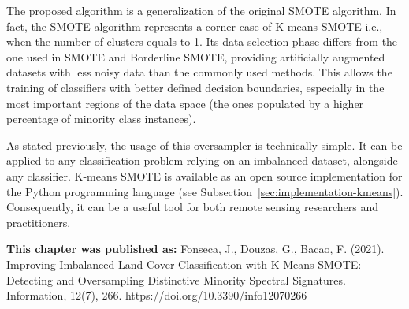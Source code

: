 The proposed algorithm is a generalization of the original SMOTE algorithm. In
fact, the SMOTE algorithm represents a corner case of K-means SMOTE i.e., when
the number of clusters equals to 1. Its data selection phase differs from the
one used in SMOTE and Borderline SMOTE, providing artificially augmented
datasets with less noisy data than the commonly used methods. This allows the
training of classifiers with better defined decision boundaries, especially in
the most important regions of the data space (the ones populated by a higher
percentage of minority class instances).

As stated previously, the usage of this oversampler is technically simple. It
can be applied to any classification problem relying on an imbalanced dataset,
alongside any classifier. K-means SMOTE is available as an open source
implementation for the Python programming language (see
Subsection~\ref{sec:implementation-kmeans}).  Consequently, it can be a useful tool
for both remote sensing researchers and practitioners.

\textbf{This chapter was published as:} Fonseca, J., Douzas, G., Bacao, F.
(2021). Improving Imbalanced Land Cover Classification with K-Means SMOTE:
Detecting and Oversampling Distinctive Minority Spectral Signatures.
Information, 12(7), 266.  https://doi.org/10.3390/info12070266

